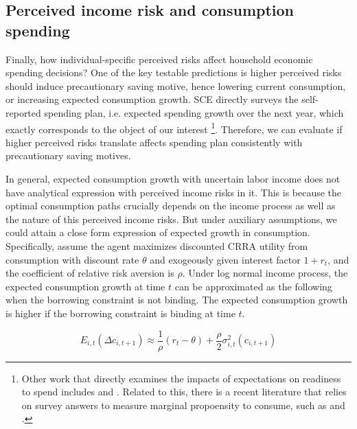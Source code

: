 
    \hypertarget{perceived-income-risk-and-spending}{%
\subsection{Perceived income risk and
consumption spending }\label{perceived-income-risk-and-spending}}

Finally, how individual-specific perceived risks affect household
economic spending decisions? One of the key testable predictions is
higher perceived risks should induce precautionary saving motive, hence lowering current consumption, or increasing expected consumption growth. 
SCE directly surveys the self-reported spending plan, i.e. expected spending growth over the next year, which exactly corresponds to the object of our interest
\footnote{Other work that directly examines the impacts of expectations on readiness to spend includes \cite{bachmann2015inflation} and  \cite{coibion2020forward}. Related to this, there is a recent literature that relies on survey answers to measure marginal propoensity to consume, such as \cite{fuster2020would} and \cite{bunn2018consumption}.}. Therefore, we can evaluate if higher perceived risks translate affects spending plan consistently with precautionary saving motives. 

In general, expected consumption growth with uncertain labor income does not have analytical expression with perceived income risks in it. This is because the optimal consumption paths crucially depends on the income process as well as the nature of this perceived income risks. But under auxiliary assumptions, we could attain a close form expression of expected growth in consumption. Specifically, assume the agent maximizes discounted CRRA utility from consumption with discount rate $\theta$ and exogeously given interest factor $1+r_t$, and the coefficient of relative risk aversion is $\rho$. Under log normal income process, the expected consumption growth at time $t$ can be approximated as the following when the borrowing constraint is not binding. The expected consumption growth is higher if the borrowing constraint is binding at time $t$.

\begin{equation}
    E_{i,t}(\Delta c_{i,t+1}) \approx \frac{1}{\rho}(r_t-\theta) + \frac{\rho}{2}\sigma^2_{i,t}(c_{i,t+1})
\end{equation}

